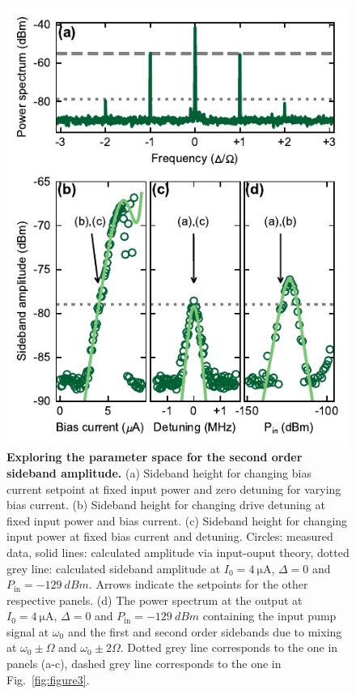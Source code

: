 \begin{figure}
	\centering
	\includegraphics[]{chapter-currentdetection/figures/SM_second_order_peak}
	\caption{
		\textbf{Exploring the parameter space for the second order sideband amplitude.}
		(a) Sideband height for changing bias current setpoint at fixed input power and zero detuning for varying bias current.
		(b) Sideband height for changing drive detuning at fixed input power and bias current.
		(c) Sideband height for changing input power at fixed bias current and detuning.
		Circles: measured data, solid lines: calculated amplitude via input-ouput theory, dotted grey line: calculated sideband amplitude at $I_0=\SI{4}{\micro\ampere}$, $\Delta=0$ and $P_\text{in}=\SI{-129}{dBm}$.
		Arrows indicate the setpoints for the other respective panels.
		(d) The power spectrum at the output at $I_0=\SI{4}{\micro\ampere}$, $\Delta=0$ and $P_\text{in}=\SI{-129}{dBm}$ containing the input pump signal at $\omega_0$ and the first and second order sidebands due to mixing at $\omega_0 \pm \Omega$ and $\omega_0 \pm 2\Omega$.
		Dotted grey line corresponds to the one in panels (a-c), dashed grey line corresponds to the one in Fig.~\ref{fig:figure3}.
	}
	\label{fig:higher-order-peaks}
\end{figure}

